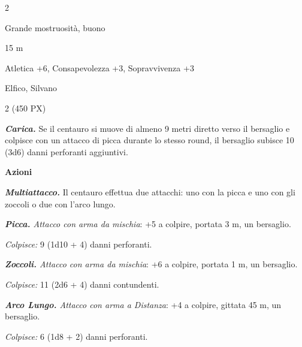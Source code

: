 \begin{multicols}{2}
{
\begin{description}[noitemsep, topsep=0pt, parsep=0pt, partopsep=0pt, itemsep=1pt, leftmargin=2.35cm,  labelwidth=2.2cm, itemindent=0cm, listparindent=0pt] %
\setlength{\baselineskip}{10pt}
\item[\textbf{Taglia/Tipo}] Grande mostruosità, buono
\item[\textbf{Caratt.}] 
\item[\textbf{Punti Ferita}] 
\item[\textbf{Movimento}] 15 m
\item[\textbf{Tiri Salvez.}] 
\item[\textbf{Comp.}] Atletica +6, Consapevolezza +3, Sopravvivenza +3
\item[\textbf{Linguaggi}] Elfico, Silvano
\item[\textbf{Sfida}] 2 (450 PX)
\end{description}
\smallskip

\emph{\textbf{Carica.}} Se il centauro si muove di almeno 9 metri diretto verso il bersaglio e colpisce con un attacco di picca durante lo stesso round, il bersaglio subisce 10 (3d6) danni perforanti aggiuntivi.

\textbf{Azioni}

\emph{\textbf{Multiattacco.}} Il centauro effettua due attacchi: uno con la picca e uno con gli zoccoli o due con l'arco lungo.

\emph{\textbf{Picca.} Attacco con arma da mischia}: +5 a colpire, portata 3 m, un bersaglio.

\emph{Colpisce:} 9 (1d10 + 4) danni perforanti.

\emph{\textbf{Zoccoli.} Attacco con arma da mischia}: +6 a colpire, portata 1 m, un bersaglio.

\emph{Colpisce:} 11 (2d6 + 4) danni contundenti.

\emph{\textbf{Arco Lungo.} Attacco con arma a Distanza}: +4 a colpire, gittata 45 m, un bersaglio.

\emph{Colpisce:} 6 (1d8 + 2) danni perforanti.

}
\end{multicols}
